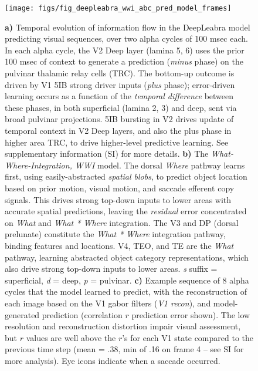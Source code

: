 \documentclass[12pt,twoside]{naturefigs}  %
\newif\myifpdf
\begin{document}
\begin{figure}
  \centering\texttt{[image: figs/fig\_deepleabra\_wwi\_abc\_pred\_model\_frames]}
  \caption{\small \protect{} {\bf a)} Temporal evolution of information flow in the DeepLeabra model predicting visual sequences, over two alpha cycles of 100 msec each.   In each alpha cycle, the V2 Deep layer (lamina 5, 6) uses the prior 100 msec of context to generate a prediction ({\em minus} phase) on the pulvinar thalamic relay cells (TRC). The bottom-up outcome is driven by V1 5IB strong driver inputs ({\em plus} phase); error-driven learning occurs as a function of the {\em temporal difference} between these phases, in both superficial (lamina 2, 3) and deep, sent via broad pulvinar projections. 5IB bursting in V2 drives update of temporal context in V2 Deep layers, and also the plus phase in higher area TRC, to drive higher-level predictive learning.  See supplementary information (SI) for more details. {\bf b)} The {\em What-Where-Integration, WWI} model. The dorsal {\em Where} pathway learns first, using easily-abstracted {\em spatial blobs}, to predict object location based on prior motion, visual motion, and saccade efferent copy signals.  This drives strong top-down inputs to lower areas with accurate spatial predictions, leaving the {\em residual} error concentrated on {\em What} and {\em What * Where} integration.  The V3 and DP (dorsal prelunate) constitute the {\em What * Where} integration pathway, binding features and locations.  V4, TEO, and TE are the {\em What} pathway, learning abstracted object category representations, which also drive strong top-down inputs to lower areas.  {\em s} suffix = superficial, {\em d} = deep, {\em p} = pulvinar. {\bf c)} Example sequence of 8 alpha cycles that the model learned to predict, with the reconstruction of each image based on the V1 gabor filters ({\em V1 recon}), and model-generated prediction (correlation $r$ prediction error shown).  The low resolution and reconstruction distortion impair visual assessment, but $r$ values are well above the $r$'s for each V1 state compared to the previous time step (mean = .38, min of .16 on frame 4 -- see SI for more analysis).  Eye icons indicate when a saccade occurred.}
  \label{fig.model}
\end{figure}
\end{document}
